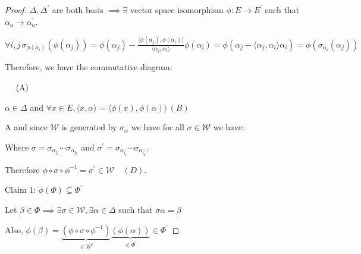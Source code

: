 \documentclass{article}
\theoremstyle{definition}
\begin{document}
\begin{proof}
    \(\Delta , \Delta^{\prime} \) are both basis \(\implies \exists\) vector space isomorphism \(\phi: E \to E^{\prime}\) such that \(\alpha_a \to \alpha_a^{\prime}\).
    
    \(\forall i,j\, \sigma_{\phi(\alpha_i)}(\phi(\alpha_j))=\phi(\alpha_j)- \frac{\langle\phi(\alpha_j), \phi(\alpha_i)\rangle}{\langle \alpha_j, \alpha_i \rangle }\phi(\alpha_i) = \phi(\alpha_j - \langle \alpha_j, \alpha_i \rangle \alpha_i) = \phi(\sigma_{\alpha_i}(\alpha_j))\)
    
    Therefore, we have the commutative diagram:

    \begin{center}
         \(\quad\)  (A)
    \end{center}

    \(\alpha \in \Delta\) and \(\forall x\in E, \langle x, \alpha \rangle = \langle \phi(x), \phi(\alpha) \rangle \, (B)\)
    
    A and since \(\mathcal{W}\) is generated by \(\sigma_\alpha\) we have for all \(\sigma \in \mathcal{W}\) we have:

    \begin{center}
    \end{center}

    Where \(\sigma = \sigma_{\alpha_{l_1}}\cdots \sigma_{\alpha_{l_k}}\) and \(\sigma^{\prime} = \sigma_{\alpha_{l_1^{\prime}}}\cdots \sigma_{\alpha_{l_k^{\prime}}}\).

    Therefore \(\phi \circ \sigma \circ \phi ^{-1} = \sigma ^{\prime} \in \mathcal{W} \quad (D)\).

    Claim 1: \(\phi(\Phi) \subseteq \Phi ^{\prime} \) 
    
    Let \(\beta \in \Phi \implies \exists \sigma \in \mathcal{W} , \exists \alpha \in \Delta\) such that \(\sigma \alpha = \beta\) 
    
    Also, \(\phi(\beta) = \underbrace{(\phi \circ \sigma \circ \phi ^{-1})}_{\in \mathcal{W} ^{\prime} }\underbrace{(\phi (\alpha))}_{\in \Phi ^{\prime}}\in \Phi ^{\prime} \)
    

\end{proof}
\end{document}

